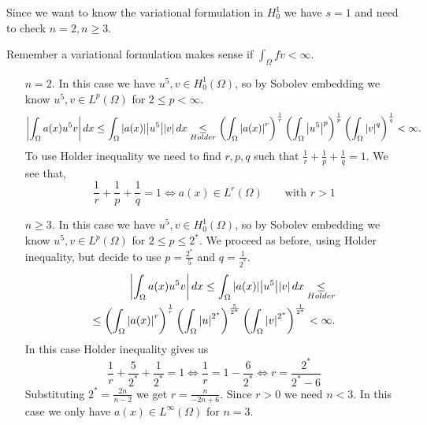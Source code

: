     Since we want to know the variational formulation in \(H^1_0\) we have \(s = 1\) and need to check \(n = 2, n \geq 3\). 
    
    Remember a variational formulation makes sense if \(\int_\Omega fv < \infty\).
    \begin{itemize}
        \item[\(n = 2\).] In this case we have \(u^5, v \in H^1_0(\Omega)\), so by Sobolev embedding we know \(u^5, v \in L^p(\Omega)\) for \(2 \leq p < \infty\). 
        \[
            \abs{\int_\Omega a(x) u^5 v}  \, dx \leq \int_\Omega \abs{a(x)} \abs{u^5} \abs{v} \, dx \underset{Holder}{\leq} \left(\int_\Omega \abs{a(x)}^r\right)^{\frac{1}{r}} \left(\int_\Omega \abs{u^5}^p \right)^{\frac{1}{p}} \left(\int_\Omega \abs{v}^q \right)^{\frac{1}{q}} < \infty.
        \]
        To use Holder inequality we need to find \(r, p, q\) such that \(\frac{1}{r} + \frac{1}{p} + \frac{1}{q} = 1\). We see that, 
        \[
            \frac{1}{r} + \frac{1}{p} + \frac{1}{q} = 1 \iff a(x) \in L^r(\Omega) \qquad \text{with } r > 1
        \]
        \item[\(n \geq 3\).] In this case we have \(u^5, v \in H^1_0(\Omega)\), so by Sobolev embedding we know \(u^5, v \in L^p(\Omega)\) for \(2 \leq p \leq 2^*\).
        We proceed as before, using Holder inequality, but decide to use \(p = \frac{2^*}{5}\) and \(q = \frac{1}{2^*}.\)
        \[
            \begin{split}
                \abs{\int_\Omega a(x) u^5 v}  \, dx \leq \int_\Omega \abs{a(x)} \abs{u^5} \abs{v} \, dx \underset{{Holder}}{\leq} \\
                \leq \left(\int_\Omega \abs{a(x)}^r\right)^{\frac{1}{r}} \left(\int_\Omega \abs{u}^{2^*} \right)^{\frac{5}{2^*}} \left(\int_\Omega \abs{v}^{2^*} \right)^{\frac{1}{2^*}} < \infty.
            \end{split}
        \]
        In this case Holder inequality gives us 
        \[
            \frac{1}{r} + \frac{5}{2^*} + \frac{1}{2^*} = 1 \iff \frac{1}{r} = 1 - \frac{6}{2^*} \iff r = \frac{2^*}{2^*-6}
        \]
        Substituting \(2^* = \frac{2n}{n - 2}\) we get \(r = \frac{n}{-2n + 6}\). Since \(r > 0\) we need \(n < 3\).
        In this case we only have \(a(x) \in L^\infty(\Omega)\) for \(n = 3\).
    \end{itemize}
    \newpage
    
